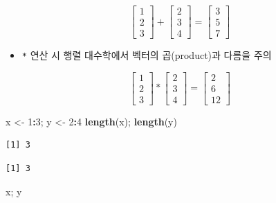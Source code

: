 \documentclass[
  11pt,
]{krantz}
\newenvironment{Shaded}{\begin{snugshade}}{\end{snugshade}}
\newcommand{\DecValTok}[1]{\textcolor[rgb]{0.06,0.06,0.06}{#1}}
\newcommand{\KeywordTok}[1]{\textcolor[rgb]{0.27,0.27,0.27}{\textbf{#1}}}
\newcommand{\NormalTok}[1]{#1}
\newcommand{\OperatorTok}[1]{\textcolor[rgb]{0.43,0.43,0.43}{\textbf{#1}}}
\newcommand{\StringTok}[1]{\textcolor[rgb]{0.5,0.5,0.5}{#1}}
\providecommand{\tightlist}{%
  \setlength{\itemsep}{0pt}\setlength{\parskip}{0pt}}
\begin{document}
\[\begin{bmatrix}
1 \\ 2\\ 3
\end{bmatrix} + 
\begin{bmatrix}
2 \\ 3\\ 4
\end{bmatrix} = 
\begin{bmatrix}
3 \\ 5 \\ 7
\end{bmatrix}
\]

\begin{itemize}
\tightlist
\item
  \texttt{*} 연산 시 행렬 대수학에서 벡터의 곱(product)과 다름을 주의
\end{itemize}

\[\begin{bmatrix}
1 \\ 2\\ 3
\end{bmatrix} * 
\begin{bmatrix}
2 \\ 3\\ 4
\end{bmatrix} = 
\begin{bmatrix}
2 \\ 6 \\ 12
\end{bmatrix}
\]

\footnotesize

\begin{Shaded}
\begin{Highlighting}[]
\NormalTok{x <-}\StringTok{ }\DecValTok{1}\OperatorTok{:}\DecValTok{3}\NormalTok{; y <-}\StringTok{ }\DecValTok{2}\OperatorTok{:}\DecValTok{4}
\KeywordTok{length}\NormalTok{(x); }\KeywordTok{length}\NormalTok{(y)}
\end{Highlighting}
\end{Shaded}

\begin{verbatim}
[1] 3
\end{verbatim}

\begin{verbatim}
[1] 3
\end{verbatim}

\begin{Shaded}
\begin{Highlighting}[]
\NormalTok{x; y}
\end{Highlighting}
\end{Shaded}
\end{document}

